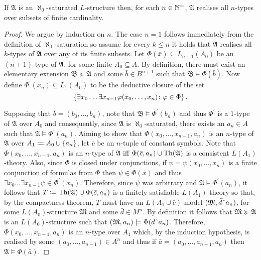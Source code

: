 \begin{prp}\label{prp:sat0}
	If $\mathfrak{A}$ is an $\aleph_0$-saturated $L$-structure then, for each $n\in\mathbb{N}^{+}$, $\mathfrak{A}$ realises all $n$-types over subsets of finite cardinality.
\end{prp}
\begin{proof}
	We argue by induction on $n$.  The case $n=1$ follows immediately from the definition of $\aleph_0$-saturation so assume for every $k\leq n$ it holds that $\mathfrak{A}$ realises all $k$-types of $\mathfrak{A}$ over any of its finite subsets.  Let $\Phi(\bar{x})\subseteq L_{n+1}(A_0)$ be an $(n+1)$-type of $\mathfrak{A}$, for some finite $A_0\subseteq A$.  By definition, there must exist an elementary extension $\mathfrak{B}\succcurlyeq\mathfrak{A}$ and some $\bar{b}\in B^{n+1}$ such that $\mathfrak{B}\models\Phi(\bar{b})$.  Now define $\Phi^\prime(x_n)\subseteq L_1(A_0)$ to be the deductive closure of the set
	\begin{equation}
		\left\lbrace \exists x_0\dotso\exists x_{n-1}\varphi(x_0,\dotsc,x_n)\colon \varphi\in\Phi \right\rbrace.
	\end{equation}

	Supposing that $\bar{b}=(b_0,\dotsc,b_n)$, note that $\mathfrak{B}\models\Phi^\prime(b_n)$ and thus $\Phi^\prime$ is a $1$-type of $\mathfrak{A}$ over $A_0$ and consequently, since $\mathfrak{A}$ is $\aleph_0$-saturated, there exists an $a_n\in A$ such that $\mathfrak{A}\models\Phi^\prime(a_n)$.  Aiming to show that $\Phi(x_0,\dotsc,x_{n-1},a_n)$ is an $n$-type of $\mathfrak{A}$ over $A_1\coloneqq A_0\cup\left\lbrace a_n\right\rbrace$, let $\bar{c}$ be an $n$-tuple of constant symbols.  Note that $\Phi(x_0,\dotsc,x_{n-1},a_n)$ is an $n$-type of $\mathfrak{A}$ iff $\Phi(\bar{c},a_n)\cup\operatorname{Th}(\mathfrak{A})$ is a consistent $L(A_1)$-theory.  Also, since $\Phi$ is closed under conjunctions, if $\psi=\psi(x_0,\dotsc,x_n)$ is a finite conjunction of formulas from $\Phi$ then $\psi\in\Phi(\bar{x})$ and thus $\exists x_0\dotso\exists x_{n-1}\psi\in\Phi^\prime(x_n)$.  Therefore, since $\psi$ was arbitrary and $\mathfrak{A}\models\Phi^\prime(a_n)$, it follows that $T\coloneqq\operatorname{Th}(\mathfrak{A})\cup\Phi(\bar{c},a_n)$ is a finitely satisfiable $L(A_1)$-theory so that, by the compactness theorem, $T$ must have an $L(A_1\cup\bar{c})$-model $(\mathfrak{M},\bar{d}\string^a_n)$, for some $L(A_0)$-structure $\mathfrak{M}$ and some $\bar{d}\in M^n$.  By definition it follows that $\mathfrak{M}\succcurlyeq\mathfrak{A}$ is an $L(A_0)$-structure such that $(\mathfrak{M},a_n)\models\Phi(\bar{d}\string^a_n)$.  Therefore, $\Phi(x_0,\dotsc,x_{n-1},a_n)$ is an $n$-type over $A_1$ which, by the induction hypothesis, is realised by some $(a_0,\dotsc,a_{n-1})\in A^n$ and thus if $\bar{a}=(a_0,\dotsc,a_{n-1},a_n)$ then $\mathfrak{A}\models\Phi(\bar{a})$.
\end{proof}

